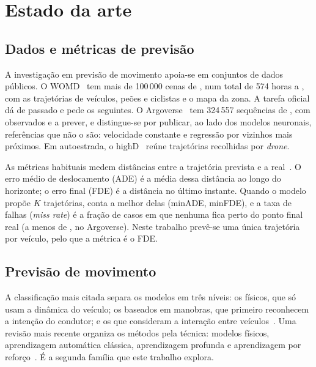 \section{Estado da arte}
\label{sec:estado-arte}

\subsection{Dados e métricas de previsão}
\label{sec:dados-metricas}

A investigação em previsão de movimento apoia-se em conjuntos de dados
públicos. O WOMD~\cite{ettinger2021large} tem mais de 100\,000 cenas de
, num total de 574 horas a , com as trajetórias de
veículos, peões e ciclistas e o mapa da zona. A tarefa oficial dá
 de passado e pede os  seguintes. O
Argoverse~\cite{chang2019argoverse} tem 324\,557 sequências de ,
com  observados e  a prever, e distingue-se por
publicar, ao lado dos modelos neuronais, referências que não o são:
velocidade constante e regressão por vizinhos mais próximos. Em
autoestrada, o highD~\cite{krajewski2018highd} reúne trajetórias
recolhidas por \emph{drone}.

As métricas habituais medem distâncias entre a trajetória prevista e a
real~\cite{chang2019argoverse,ettinger2021large}. O erro médio de
deslocamento (ADE) é a média dessa distância ao longo do horizonte; o
erro final (FDE) é a distância no último instante. Quando o modelo propõe
$K$ trajetórias, conta a melhor delas (minADE, minFDE), e a taxa de
falhas (\emph{miss rate}) é a fração de casos em que nenhuma fica perto do
ponto final real (a menos de , no Argoverse). Neste trabalho
prevê-se uma única trajetória por veículo, pelo que a métrica é o FDE.

\subsection{Previsão de movimento}
\label{sec:previsao}

A classificação mais citada separa os modelos em três níveis: os físicos,
que só usam a dinâmica do veículo; os baseados em manobras, que primeiro
reconhecem a intenção do condutor; e os que consideram a interação entre
veículos~\cite{lefevre2014survey}. Uma revisão mais recente organiza os
métodos pela técnica: modelos físicos, aprendizagem automática clássica,
aprendizagem profunda e aprendizagem por
reforço~\cite{huang2022survey}. É a segunda família que este trabalho
explora.

